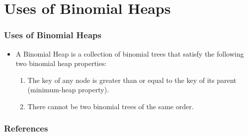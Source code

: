 \documentclass[13pt]{beamer}
\begin{document}
\section{Uses of Binomial Heaps} %
\begin{frame}
\frametitle{Uses of Binomial Heaps}
  \begin{itemize}
    \item A \alert{Binomial Heap} is a collection of binomial trees that satisfy the following two binomial heap properties:
      \begin{enumerate}
        \item The key of any node is greater than or equal to the key of its parent (minimum-heap property).
        \item There cannot be two binomial trees of the same order.
      \end{enumerate}
  \end{itemize}
\end{frame}

 \begin{frame}
  \frametitle{References}
  \nocite{*} 
  
\end{frame}
\end{document}
